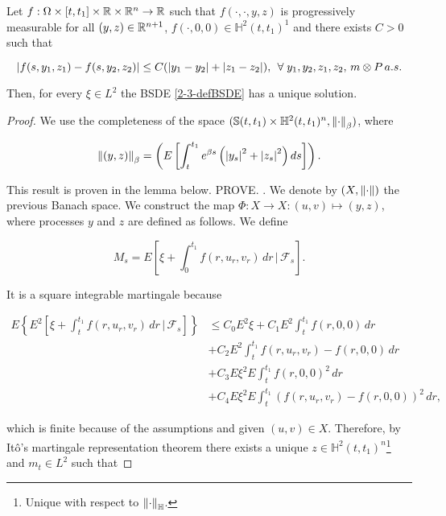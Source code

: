 \begin{theorem}
    Let $f:\Omega\times[t,t_1]\times\mathbb{R}\times\mathbb{R}^n\rightarrow \mathbb{R}$ such that $f(\cdot,\cdot,y,z)$ is progressively measurable for all 
    $(y,z)\in\mathbb{R}^{n+1}$, $f(\cdot,0,0)\in\mathbb{H}^2(t,t_1)^1$ and there exists $C>0$ such that

    \begin{equation}
        \abs{f(s,y_1,z_1)-f(s,y_2,z_2)} \leq C(\abs{y_1-y_2} + \abs{z_1-z_2}),\,\forall y_1,y_2,z_1,z_2,\, m\otimes P\,a.s.
    \end{equation}

    Then, for every $\xi\in L^2$ the BSDE \eqref{2-3-defBSDE} has a unique solution.

    \begin{proof}
        We use the completeness of the space $(\mathbb{S}(t,t_1)\times\mathbb{H}^2(t,t_1)^n, \norm{\cdot}_{\beta})$, where

        \begin{equation}
            \norm{(y,z)}_{\beta} = \left(E\left[\int_t^{t_1} e^{\beta s}\left(\abs{y_s}^2+\abs{z_s}^2\right)ds\right]\right).
        \end{equation}

        {\color{red}{}This result is proven in the lemma below. PROVE. }. We denote by $(X,\norm{\cdot})$ the previous Banach space. We construct the map 
        $\Phi:X\rightarrow X:(u,v)\mapsto(y,z)$, where processes $y$ and $z$ are defined as follows. We define

        \begin{equation}
            M_s = E\left[\xi + \int_0^{t_1} f(r,u_r,v_r)\,dr\,|\,\mathcal{F}_s\right].
        \end{equation}

        It is a square integrable martingale because
        
        \begin{align*}
            E\left\{E^2\left[\xi + \int_t^{t_1} f(r,u_r,v_r)\,dr\,|\,\mathcal{F}_s\right]\right\} & \leq C_0 E^2\xi + C_1E^2\int_t^{t_1} f(r,0,0)\,dr \\
            & + C_2E^2\int_t^{t_1} f(r,u_r,v_r)-f(r,0,0)\,dr \\
            & + C_3E\xi^2E\int_t^{t_1}f(r,0,0)^2\,dr \\
            & + C_4E\xi^2E\int_t^{t_1}(f(r,u_r,v_r)-f(r,0,0))^2\,dr, 
        \end{align*}

        which is finite because of the assumptions and given $(u,v)\in X$. Therefore, by 
        It\^o's martingale representation theorem there exists a unique $z\in\mathbb{H}^2(t,t_1)^n$\footnote{Unique with respect to $\norm{\cdot}_{\mathbb{H}}$.} and $m_t\in L^2$ such that
        

\end{proof}
\end{theorem}
